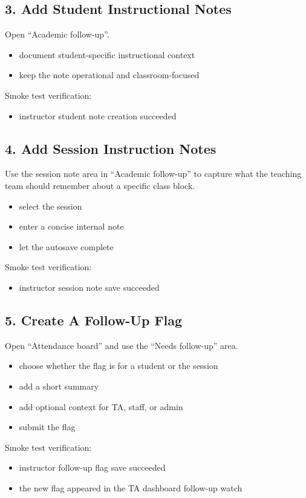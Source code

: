 \documentclass[11pt]{article}
\begin{document}
\subsection*{3. Add Student Instructional Notes}
Open ``Academic follow-up''.
\begin{itemize}
  \item document student-specific instructional context
  \item keep the note operational and classroom-focused
\end{itemize}

Smoke test verification:
\begin{itemize}
  \item instructor student note creation succeeded
\end{itemize}

\subsection*{4. Add Session Instruction Notes}
Use the session note area in ``Academic follow-up'' to capture what the teaching team should remember about a specific class block.
\begin{itemize}
  \item select the session
  \item enter a concise internal note
  \item let the autosave complete
\end{itemize}

Smoke test verification:
\begin{itemize}
  \item instructor session note save succeeded
\end{itemize}

\subsection*{5. Create A Follow-Up Flag}
Open ``Attendance board'' and use the ``Needs follow-up'' area.
\begin{itemize}
  \item choose whether the flag is for a student or the session
  \item add a short summary
  \item add optional context for TA, staff, or admin
  \item submit the flag
\end{itemize}

Smoke test verification:
\begin{itemize}
  \item instructor follow-up flag save succeeded
  \item the new flag appeared in the TA dashboard follow-up watch
\end{itemize}
\end{document}
